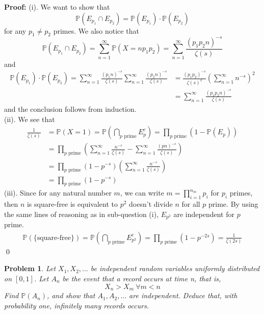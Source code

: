\documentclass[12pt]{article}
\newtheorem{problem}{Problem}
\begin{document}
\textbf{Proof:} (i). We want to show that 
$$
    \mathbb{P}(E_{p_1}\cap E_{p_2})=\mathbb{P}(E_{p_1})\cdot\mathbb{P}(E_{p_2})
$$
for any $p_1\neq p_2$ primes. We also notice that 
$$
\mathbb{P}(E_{p_1}\cap E_{p_2})=\sum_{n=1}^\infty\mathbb{P}(X=np_1p_2)=\sum_{n=1}^\infty\frac{(p_1p_2n)^{-s}}{\zeta(s)}
$$
and 
\begin{align*}
    \mathbb{P}(E_{p_1})\cdot\mathbb{P}(E_{p_2})=\sum_{n=1}^\infty\frac{(p_1n)^{-s}}{\zeta(s)}\sum_{n=1}^\infty\frac{(p_2n)^{-s}}{\zeta(s)}&=\frac{(p_1p_2)^{-s}}{\zeta(s)^2}\left(\sum_{n=1}^\infty n^{-s}\right)^2 \\
    &=\sum_{n=1}^\infty\frac{(p_1p_2n)^{-s}}{\zeta(s)}
\end{align*}
and the conclusion follows from induction. \\
\indent (ii). We see that 
\begin{align*}
    \frac{1}{\zeta(s)}&=\mathbb{P}(X=1)=\mathbb{P}\left(\bigcap_{p\text{ prime}} E_p^c\right)=\prod_{p\text{ prime}}\left(1-\mathbb{P}\left(E_p\right)\right) \\
    &=\prod_{p\text{ prime}}\left(\sum_{n=1}^\infty\frac{n^{-s}}{\zeta(s)}-\sum_{n=1}^\infty\frac{(pn)^{-s}}{\zeta(s)}\right) \\
    &= \prod_{p\text{ prime}}(1-p^{-s})\left(\sum_{n=1}^\infty\frac{n^{-s}}{\zeta(s)}\right) \\
    &=\prod_{p\text{ prime}}(1-p^{-s})
\end{align*}
\indent (iii). Since for any natural number $m$, we can write $m=\prod_{i=1}^{n_m}p_i$ for $p_i$ primes, then $n$ is square-free is equivalent to $p^2$ doesn't divide $n$ for all $p$ prime. By using the same lines of reasoning as in sub-question (i), $E_{p^2}$ are independent for $p$ prime. 
\begin{align*}
    \mathbb{P}(\{\text{square-free}\})=\mathbb{P}\left(\bigcap_{p\text{ prime}}E_{p^2}^c\right)=\prod_{p\text{ prime}}(1-p^{-2s})=\frac{1}{\zeta(2s)}
\end{align*}\qed
\\
\begin{problem}
    Let $X_1, X_2, \dots$ be independent random variables uniformly distributed on $[0,1]$. Let $A_n$ be the event that a record occurs at time n, that is, 
    $$
        X_n>X_m \ \forall m<n
    $$
    Find $\mathbb{P}(A_n)$, and show that $A_1, A_2, \dots$ are independent. Deduce that, with probability one, infinitely many records occurs.
\end{problem}
\end{document}
